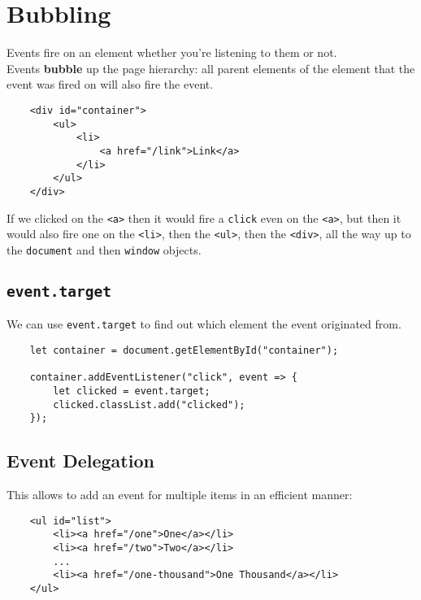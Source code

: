 \section{Bubbling}

Events fire on an element whether you're listening to them or not.
\\

Events \textbf{bubble} up the page hierarchy: all parent elements of the element that the event was fired on will also fire the event.

\begin{verbatim}
    <div id="container">
        <ul>
            <li>
                <a href="/link">Link</a>
            </li>
        </ul>
    </div>
\end{verbatim}

If we clicked on the \texttt{<a>} then it would fire a \texttt{click} even on the \texttt{<a>}, but then it would also fire one on the \texttt{<li>}, then the \texttt{<ul>}, then the \texttt{<div>}, all the way up to the \texttt{document} and then \texttt{window} objects.

\pagebreak

\subsection{\texttt{event.target}}

We can use \texttt{event.target} to find out which element the event originated from.

\begin{verbatim}
    let container = document.getElementById("container");

    container.addEventListener("click", event => {
        let clicked = event.target;
        clicked.classList.add("clicked");
    });
\end{verbatim}


\subsection{Event Delegation}

This allows to add an event for multiple items in an efficient manner:

\begin{verbatim}
    <ul id="list">
        <li><a href="/one">One</a></li>
        <li><a href="/two">Two</a></li>
        ...
        <li><a href="/one-thousand">One Thousand</a></li>
    </ul>
\end{verbatim}

